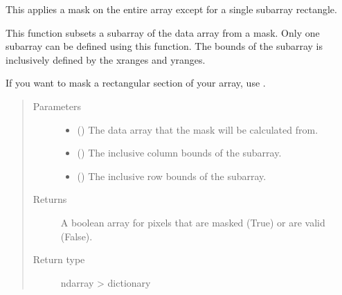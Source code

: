 \documentclass[letterpaper,10pt,english]{sphinxmanual}
\begin{document}

\begin{fulllineitems}
\label{\detokenize{docstrings/ifa_smeargle.masking.geometric:ifa_smeargle.masking.geometric.mask_subarray}}
This applies a mask on the entire array except for a single
sub\sphinxhyphen{}array rectangle.

This function subsets a sub\sphinxhyphen{}array of the data array from a
mask. Only one sub\sphinxhyphen{}array can be defined using this function.
The bounds of the sub\sphinxhyphen{}array is inclusively defined by the
x\sphinxhyphen{}ranges and y\sphinxhyphen{}ranges.

If you want to mask a rectangular section of your array, use
.
\begin{quote}\begin{description}
\item[{Parameters}] \leavevmode\begin{itemize}
\item {} 
 () \textendash{} The data array that the mask will be calculated from.

\item {} 
 () \textendash{} The inclusive column bounds of the sub\sphinxhyphen{}array.

\item {} 
 () \textendash{} The inclusive row bounds of the sub\sphinxhyphen{}array.

\end{itemize}

\item[{Returns}] \leavevmode
{} \textendash{} A boolean array for pixels that are masked (True) or are
valid (False).

\item[{Return type}] \leavevmode
ndarray \sphinxhyphen{}\textgreater{} dictionary

\end{description}\end{quote}

\end{fulllineitems}
\end{document}
